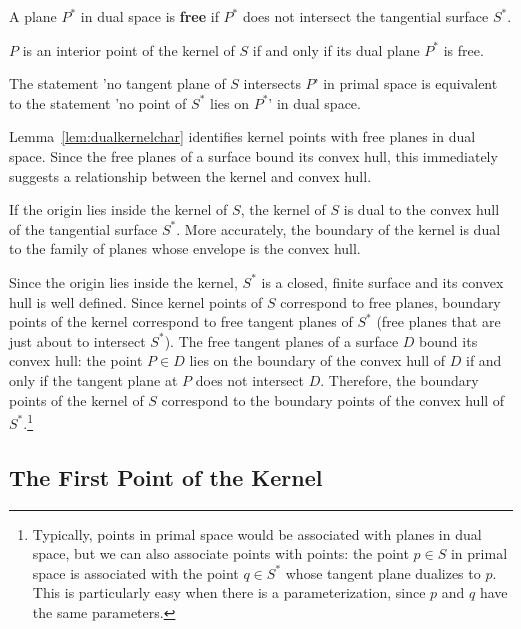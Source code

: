 \documentclass{elsart}
\begin{document}
\begin{defn2}
A plane $P^*$ in dual space is {\bf free} if $P^*$ does not intersect the tangential surface $S^*$.
\end{defn2}

\begin{lemma}
\label{lem:dualkernelchar}
$P$ is an interior point of the kernel of $S$ if and only if 
its dual plane $P^*$ is free.
\end{lemma}
\prf
The statement 'no tangent plane of $S$ intersects $P$' in primal space
is equivalent to the statement 'no point of $S^*$ lies on $P^*$' in dual space.
\QED

Lemma~\ref{lem:dualkernelchar} identifies kernel points
with free planes in dual space.
Since the free planes of a surface bound its convex hull,
this immediately suggests a relationship between the kernel and convex hull.

\begin{theorem}
\label{thm:kernelhull}
If the origin lies inside the kernel of $S$,
the kernel of $S$ is dual to the convex hull of the tangential surface $S^*$.
%
%
More accurately, the boundary of the kernel is dual to the family of planes whose
envelope is the convex hull.
\end{theorem}
\prf
Since the origin lies inside the kernel, $S^*$ is a closed, finite surface
and its convex hull is well defined.
Since kernel points of $S$ correspond to free planes,
boundary points of the kernel correspond to free tangent planes of $S^*$
(free planes that are just about to intersect $S^*$).
The free tangent planes of a surface $D$ bound its convex hull: the point $P \in D$ lies
on the boundary of the convex hull of $D$ if and only if the tangent plane at $P$ 
does not intersect $D$.
Therefore, the boundary points of the kernel of $S$ correspond to the boundary points
of the convex hull of $S^*$.\footnote{Typically, points in primal space would be associated with planes in dual space,
	but we can also associate points with points:
	the point $p \in S$ in primal space is associated
	with the point $q \in S^*$ whose tangent plane dualizes to $p$.
	This is particularly easy when there is a parameterization, since $p$ and $q$ 
	have the same parameters.}
\QED


\subsection{The First Point of the Kernel}
\label{sec:firstpt}
\end{document}
